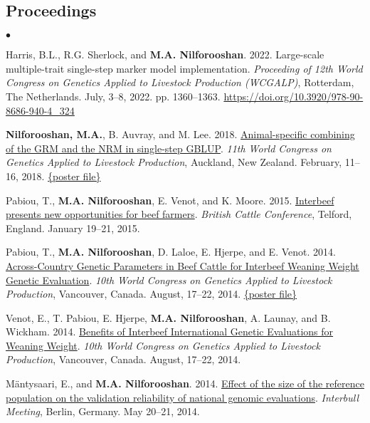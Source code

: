 \documentclass[margin,line]{res}
\newenvironment{list2}{
  \begin{list}{$\bullet$}{%
      \setlength{\itemsep}{0in}
      \setlength{\parsep}{0in} \setlength{\parskip}{0in}
      \setlength{\topsep}{0in} \setlength{\partopsep}{0in}
      \setlength{\leftmargin}{0.2in}}}{\end{list}}
\begin{document}
\begin{resume}
  \section{\sc Proceedings}

  \begin{list2}
    \item Harris, B.L., R.G. Sherlock, and {\bf M.A. Nilforooshan}. 2022. Large-scale multiple-trait single-step marker model implementation. {\em Proceeding of 12th World Congress on Genetics Applied to Livestock Production (WCGALP)}, Rotterdam, The Netherlands. July, 3--8, 2022. pp. 1360--1363. \url{https://doi.org/10.3920/978-90-8686-940-4_324}
    \item {\bf Nilforooshan, M.A.}, B. Auvray, and M. Lee. 2018. \href{https://www.researchgate.net/publication/358198782_Animal-specific_combining_of_the_GRM_and_the_NRM_in_single-step_GBLUP}{Animal-specific combining of the GRM and the NRM in single-step GBLUP}. {\em 11th World Congress on Genetics Applied to Livestock Production}, Auckland, New Zealand. February, 11--16, 2018. \href{https://doi.org/10.13140/RG.2.2.25768.03843}{\{poster file\}}
    \item Pabiou, T., {\bf M.A. Nilforooshan}, E. Venot, and  K. Moore. 2015. \href{https://www.researchgate.net/publication/358198790_Interbeef_presents_new_opportunities_for_beef_farmers}{Interbeef presents new opportunities for beef farmers}. {\em British Cattle Conference}, Telford, England. January 19--21, 2015.
    \item Pabiou, T., {\bf M.A. Nilforooshan}, D. Laloe, E. Hjerpe, and E. Venot. 2014. \href{https://www.researchgate.net/publication/268110020_ACROSS-COUNTRY_GENETIC_PARAMETERS_IN_BEEF_CATTLE_FOR_INTERBEEF_WEANING_WEIGHT_GENETIC_EVALUATION}{Across-Country Genetic Parameters in Beef Cattle for Interbeef Weaning Weight Genetic Evaluation}. {\em 10th World Congress on Genetics Applied to Livestock Production}, Vancouver, Canada. August, 17--22, 2014. \href{http://dx.doi.org/10.13140/RG.2.2.33036.80003}{\{poster file\}}
    \item Venot, E., T. Pabiou, E. Hjerpe, {\bf M.A. Nilforooshan}, A. Launay, and B. Wickham. 2014. \href{https://www.researchgate.net/publication/268109933_Benefits_of_Interbeef_international_genetic_evaluations_for_weaning_weight}{Benefits of Interbeef International Genetic Evaluations for Weaning Weight}. {\em 10th World Congress on Genetics Applied to Livestock Production}, Vancouver, Canada. August, 17--22, 2014.
    \item M\"{a}ntysaari, E., and {\bf M.A. Nilforooshan}. 2014. \href{https://drive.google.com/file/d/0B2l_izQwJmVpY3B1dTRtMmlWV1E/view?usp=sharing&resourcekey=0-noBm5g1J1txJWu7nFhvD1A}{Effect of the size of the reference population on the validation reliability of national genomic evaluations}. {\em Interbull Meeting}, Berlin, Germany. May 20--21, 2014.

\end{list2}
\end{resume}
\end{document}
